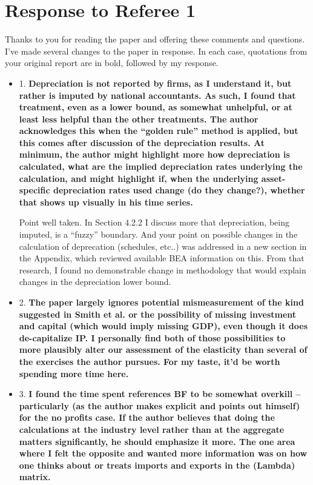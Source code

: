 \documentclass[11pt]{article}
\begin{document}


\section*{Response to Referee 1}
\onehalfspacing 

Thanks to you for reading the paper and offering these comments and questions. I've made several changes to the paper in response. In each case, quotations from your original report are in bold, followed by my response. 

\begin{itemize}
	\item 1. \textbf{Depreciation is not reported by firms, as I understand it, but rather is imputed by national accountants. As such, I found that treatment, even as a lower bound, as somewhat unhelpful, or at least less helpful than the other treatments. The author acknowledges this when the “golden rule” method is applied, but this comes after discussion of the depreciation results. At minimum, the author might highlight more how depreciation is calculated, what are the implied depreciation rates underlying the calculation, and might highlight if, when the underlying asset-specific depreciation rates used change (do they change?), whether that shows up visually in his time series.}

	Point well taken. In Section 4.2.2 I discuss more that depreciation, being imputed, is a ``fuzzy'' boundary. And your point on possible changes in the calculation of deprecation (schedules, etc..) was addressed in a new section in the Appendix, which reviewed available BEA information on this. From that research, I found no demonstrable change in methodology that would explain changes in the depreciation lower bound. 

	\item 2. \textbf{The paper largely ignores potential mismeasurement of the kind suggested in Smith et al. or the possibility of missing investment and capital (which would imply missing GDP), even though it does de-capitalize IP. I personally find both of those possibilities to more plausibly alter our assessment of the elasticity than several of the exercises the author pursues. For my taste, it’d be worth spending more time here.}

	\item 3. \textbf{I found the time spent references BF to be somewhat overkill – particularly (as the author makes explicit and points out himself) for the no profits case. If the author believes that doing the calculations at the industry level rather than at the aggregate matters significantly, he should emphasize it more. The one area where I felt the opposite and wanted more information was on how one thinks about or treats imports and exports in the (Lambda) matrix.}


\end{itemize}
\end{document}

